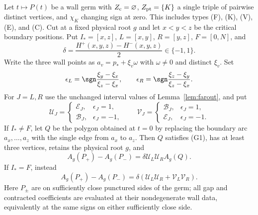 \begin{theorem}\label{thm:single-triple}\leanok
Let $t\mapsto P(t)$ be a wall germ with $Z_{\rm c}=\varnothing$,
$Z_{\rm pt}=\{K\}$ a single triple of pairwise distinct vertices,
and $\chi_K$ changing sign at zero. This includes types (F), (K),
(V), (E), and (C). Cut at a fixed physical root $g$ and let
$x<y<z$ be the critical boundary positions. Put
$I_*=[x,z]$, $L=[x,y]$, $R=[y,z]$, $F=[0,N]$, and
\begin{equation}\label{afr:wall-data}
\delta=\frac{H^+(x,y,z)-H^-(x,y,z)}2\in\{-1,1\}.
\end{equation}
Write the three wall points as $a_v=p_*+\xi_v\omega$ with
$\omega\ne0$ and distinct $\xi_v$. Set
\begin{equation}\label{afr:wall-epsilons}
\epsilon_L=\sgn\frac{\xi_y-\xi_x}{\xi_z-\xi_x},\qquad
\epsilon_R=\sgn\frac{\xi_z-\xi_y}{\xi_z-\xi_x}.
\end{equation}
For $J=L,R$ use the unchanged interval values of
Lemma~\ref{lem:farout}, and put
\begin{equation}\label{afr:wall-uv}
\mathcal U_J=\begin{cases}\mathcal E_J,&\epsilon_J=1,\\
\mathcal B_J,&\epsilon_J=-1,\end{cases}\qquad
\mathcal V_J=\begin{cases}\mathcal B_J,&\epsilon_J=1,\\
\mathcal E_J,&\epsilon_J=-1.\end{cases}
\end{equation}
If $I_*\ne F$, let $Q$ be the polygon obtained at $t=0$ by
replacing the boundary arc $a_x,\ldots,a_z$ with the single edge
from $a_x$ to $a_z$. Then $Q$ satisfies (G1), has at least three
vertices, retains the physical root $g$, and
\begin{equation}\label{afr:wall-proper}
A_g(P_+)-A_g(P_-)=\delta\mathcal U_L\mathcal U_R A_g(Q).
\end{equation}
If $I_*=F$, instead
\begin{equation}\label{afr:wall-full}
A_g(P_+)-A_g(P_-)
=\delta(\mathcal U_L\mathcal U_R+\mathcal V_L\mathcal V_R).
\end{equation}
Here $P_\pm$ are on sufficiently close punctured sides of the germ;
all gap and contracted coefficients are evaluated at their nondegenerate
wall data, equivalently at the same signs on either sufficiently close side.

\end{theorem}
